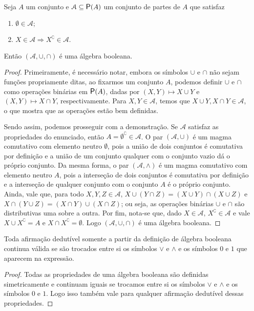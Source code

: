 \begin{proposition}
\label{prop:algeb.subconj}
	Seja $A$ um conjunto e $\mathcal A \subseteq \p(A)$ um conjunto de partes de $A$ que satisfaz
	\begin{enumerate}
	\item $\emptyset \in \mathcal A$;
	\item $X \in \mathcal A \Rightarrow X^\complement \in \mathcal A$.
	\end{enumerate}
Então $(\mathcal A,\cup,\cap)$ é uma álgebra booleana.
\end{proposition}
\begin{proof}
	Primeiramente, é necessário notar, embora os símbolos $\cup$ e $\cap$ não sejam funções propriamente ditas, ao fixarmos um conjunto $A$, podemos definir $\cup$ e $\cap$ como operações binárias em $\p(A)$, dadas por $(X,Y) \mapsto X \cup Y$ e $(X,Y) \mapsto X \cap Y$, respectivamente. Para $X,Y \in \mathcal A$, temos que $X \cup Y,X \cap Y \in \mathcal A$, o que mostra que as operações estão bem definidas.

	Sendo assim, podemos prosseguir com a demonstração. Se $\mathcal A$ satisfaz as propriedades do enunciado, então $A = \emptyset^\complement \in \mathcal A$. O par $(\mathcal A,\cup)$ é um magma comutativo com elemento neutro $\emptyset$, pois a união de dois conjuntos é comutativa por definição e a união de um conjunto qualquer com o conjunto vazio dá o próprio conjunto. Da mesma forma, o par $(\mathcal A,\wedge)$ é um magma comutativo com elemento neutro $A$, pois a interseção de dois conjuntos é comutativa por definição e a interseção de qualquer conjunto com o conjunto $A$ é o próprio conjunto. Ainda, vale que, para todo $X,Y,Z \in \mathcal A$, $X \cup (Y \cap Z) = (X \cup Y) \cap (X \cup Z)$ e $X \cap (Y \cup Z) = (X \cap Y) \cup (X \cap Z)$; ou seja, as operações binárias $\cup$ e $\cap$ são distributivas uma sobre a outra. Por fim, nota-se que, dado $X \in \mathcal A$, $X^\complement \in \mathcal A$ e vale $X \cup X^\complement = A$ e $X \cap X^\complement = \emptyset$. Logo $(\mathcal A,\cup,\cap)$ é uma álgebra booleana.
\end{proof}

\begin{proposition}
	Toda afirmação dedutível somente a partir da definição de álgebra booleana continua válida se são trocados entre si os símbolos $ \vee $ e $\wedge$ e os símbolos $0$ e $1$ que aparecem na expressão.
\end{proposition}
\begin{proof}
	Todas as propriedades de uma álgebra booleana são definidas simetricamente e continuam iguais se trocamos entre si os símbolos $ \vee $ e $\wedge$ e os símbolos $0$ e $1$. Logo isso também vale para qualquer afirmação dedutível dessas propriedades.
\end{proof}

